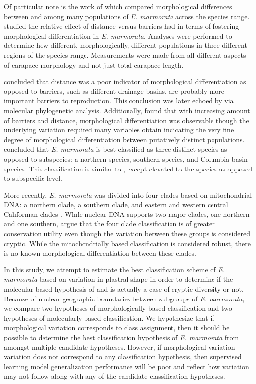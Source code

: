 \documentclass[12pt,letterpaper]{article}\usepackage{graphicx, color}
\begin{document}
Of particular note is the work of \citet{Holland1992} which compared morphological differences between and among many populations of \textit{E. marmorata} across the species range. \citet{Holland1992} studied the relative effect of distance versus barriers had in terms of fostering morphological differentiation in \textit{E. marmorata}. Analyses were performed to determine how different, morphologically, different populations in three different regions of the species range. Measurements were made from all different aspects of carapace morphology and not just total carapace length. 

\citet{Holland1992} concluded that distance was a poor indicator of morphological differentiation as opposed to barriers, such as different drainage basins, are probably more important barriers to reproduction. This conclusion was later echoed by \citet{Spinks2005} via molecular phylogenetic analysis. Additionally, \citet{Holland1992} found that with increasing amount of barriers and distance, morphological differentiation was observable though the underlying variation required many variables obtain indicating the very fine degree of morphological differentiation between putatively distinct populations. \citet{Holland1992} concluded that \textit{E. marmorata} is best classified as three distinct species as opposed to subspecies: a northern species, southern species, and Columbia basin species. This classification is similar to \citet{Seeliger1945}, except elevated to the species as opposed to subspecific level.

More recently, \textit{E. marmorata} was divided into four clades based on mitochondrial DNA: a northern clade, a southern clade, and eastern and western central Californian clades \citep{Spinks2005,Spinks2010}. While nuclear DNA supports two major clades, one northern and one southern, \citet{Spinks2010} argue that the four clade classification is of greater conservation utility even though the variation between these groups is considered cryptic. 
While the mitochondrially based classification is considered robust, there is no known morphological differentiation between these clades.

In this study, we attempt to estimate the best classification scheme of \textit{E. marmorata} based on variation in plastral shape in order to determine if the molecular based hypothesis of \citet{Spinks2005} and \citet{Spinks2010} is actually a case of cryptic diversity or not. Because of unclear geographic boundaries between subgroups of \textit{E. marmorata}, we compare two hypotheses of morphologically based classification and two hypotheses of molecularly based classification. We hypothesize that if morphological variation corresponds to class assignment, then it should be possible to determine the best classification hypothesis of \textit{E. marmorata} from amongst multiple candidate hypotheses. However, if morphological variation variation does not correspond to any classification hypothesis, then supervised learning model generalization performance will be poor and reflect how variation may not follow along with any of the candidate classification hypotheses.
\end{document}
